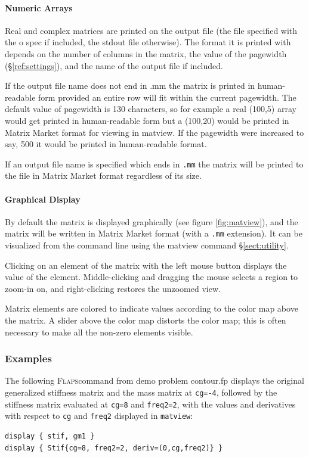 \documentclass[11pt,openany,twoside]{book}
\numberwithin{equation}{section}		%
\newcommand{\Cmd}[1]{{\sf #1}}
\newcommand{\Code}[1]{{\small\tt #1}}
\newcommand{\Flaps}{\textsc{Flaps\:}}
\newcommand{\Spec}[1]{{\small\ttfamily #1}}
\newcommand{\Sectref}[1]{\S\ref{#1}}
\begin{document}
\paragraph{Numeric Arrays}
Real and complex matrices are printed on the output file
(the file specified with the \Spec{o} spec if included,
the stdout file otherwise). The format it is printed with depends
on the number of columns in the matrix, the value of the
pagewidth (\Sectref{ref:settings}), and the name of
the output file if included.
\par
If the output file name does not end in \Spec{.mm}
the matrix is printed in human-readable form provided an entire
row will fit within the current pagewidth. The default value
of pagewidth is 130 characters, so for example a real (100,5)
array would get printed in human-readable form but a (100,20)
would be printed in Matrix Market \cite{matrixmarket}
format for viewing in \Cmd{matview}.
If the pagewidth were increased to say, 500 it would be printed
in human-readable format.
\par
If an output file name is specified which ends in \Code{.mm}
the matrix will be printed to the file in Matrix Market \cite{matrixmarket}
format regardless of its size.

\paragraph{Graphical Display}
By default the matrix is displayed graphically
(see figure \ref{fig:matview}), and
the matrix will be written in Matrix Market format (with a \Code{.mm} extension).
It can be visualized from the command line using the \Cmd{matview}
command \Sectref{sect:utility}.
        
Clicking on an element of the matrix with the left mouse button
displays the value of the element.
Middle-clicking and dragging the mouse selects a region
to zoom-in on, and right-clicking restores the unzoomed view.
        
Matrix elements are colored to indicate values according
to the color map above the matrix. A slider above the
color map distorts the color map; this is often necessary
to make all the non-zero elements visible.
        
\subsubsection{Examples}
The following \Flaps command from demo problem contour.fp
displays the original generalized stiffness matrix and the mass
matrix at \Code{cg=-4}, followed by the stiffness matrix evaluated at
\Code{cg=8} and \Code{freq2=2}, with the values and derivatives with
respect to \Code{cg} and \Code{freq2} displayed in \Code{matview}:
\begin{lstlisting}
display { stif, gm1 }
display { Stif{cg=8, freq2=2, deriv=(0,cg,freq2)} }
\end{lstlisting}
\end{document}
